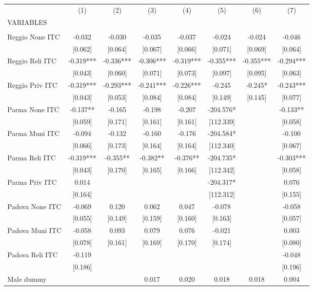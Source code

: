 \begin{tabular}{lccccccc} \hline
 & (1) & (2) & (3) & (4) & (5) & (6) & (7) \\
VARIABLES &  &  &  &  &  &  &  \\ \hline
 &  &  &  &  &  &  &  \\
Reggio None ITC & -0.032 & -0.030 & -0.035 & -0.037 & -0.024 & -0.024 & -0.046 \\
 & [0.062] & [0.064] & [0.067] & [0.066] & [0.071] & [0.069] & [0.064] \\
Reggio Reli ITC & -0.319*** & -0.336*** & -0.306*** & -0.319*** & -0.355*** & -0.355*** & -0.294*** \\
 & [0.043] & [0.060] & [0.071] & [0.073] & [0.097] & [0.095] & [0.063] \\
Reggio Priv ITC & -0.319*** & -0.293*** & -0.241*** & -0.226*** & -0.245 & -0.245* & -0.243*** \\
 & [0.043] & [0.053] & [0.084] & [0.084] & [0.149] & [0.145] & [0.077] \\
Parma None ITC & -0.137** & -0.165 & -0.198 & -0.207 & -204.576* &  & -0.133** \\
 & [0.059] & [0.171] & [0.161] & [0.161] & [112.339] &  & [0.058] \\
Parma Muni ITC & -0.094 & -0.132 & -0.160 & -0.176 & -204.584* &  & -0.100 \\
 & [0.066] & [0.173] & [0.164] & [0.164] & [112.340] &  & [0.067] \\
Parma Reli ITC & -0.319*** & -0.355** & -0.382** & -0.376** & -204.735* &  & -0.303*** \\
 & [0.043] & [0.170] & [0.165] & [0.166] & [112.342] &  & [0.058] \\
Parma Priv ITC & 0.014 &  &  &  & -204.317* &  & 0.076 \\
 & [0.164] &  &  &  & [112.312] &  & [0.155] \\
Padova None ITC & -0.069 & 0.120 & 0.062 & 0.047 & -0.078 &  & -0.058 \\
 & [0.055] & [0.149] & [0.159] & [0.160] & [0.163] &  & [0.057] \\
Padova Muni ITC & -0.058 & 0.093 & 0.079 & 0.076 & -0.021 &  & 0.003 \\
 & [0.078] & [0.161] & [0.169] & [0.170] & [0.174] &  & [0.080] \\
Padova Reli ITC & -0.119 &  &  &  &  &  & -0.048 \\
 & [0.186] &  &  &  &  &  & [0.196] \\
Male dummy &  &  & 0.017 & 0.020 & 0.018 & 0.018 & 0.004 \\

\end{tabular}

